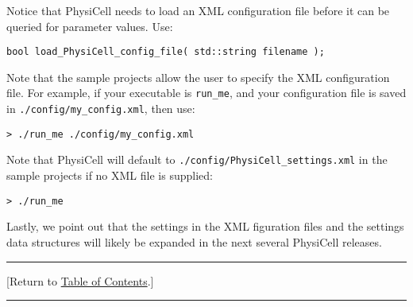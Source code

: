 \documentclass[12pt]{article}
\renewcommand{\v}{\verb}
\newcommand{\TOClink}{\begin{center}\hrule\vskip-10pt\phantom{.}\hfill[Return to \hyperlink{TOC}{Table of Contents}.]\hfill\phantom{.}\vskip3pt\hrule\end{center}}
\begin{document}
Notice that PhysiCell needs to load an XML configuration file 
before it can be queried for parameter values. Use: 

\v|bool load_PhysiCell_config_file( std::string filename );| 

Note that the sample projects allow the user to specify 
the XML configuration file. For example, if your executable is 
\v|run_me|, and your configuration file is saved in 
\v|./config/my_config.xml|, then use: 

\v|> ./run_me ./config/my_config.xml|

Note that PhysiCell will default to \v|./config/PhysiCell_settings.xml| 
in the sample projects if no XML file is supplied: 

\v|> ./run_me |

Lastly, we point out that the settings in the XML figuration files and the settings 
data structures will likely be expanded in the next several PhysiCell releases. 

\TOClink 
\end{document}
